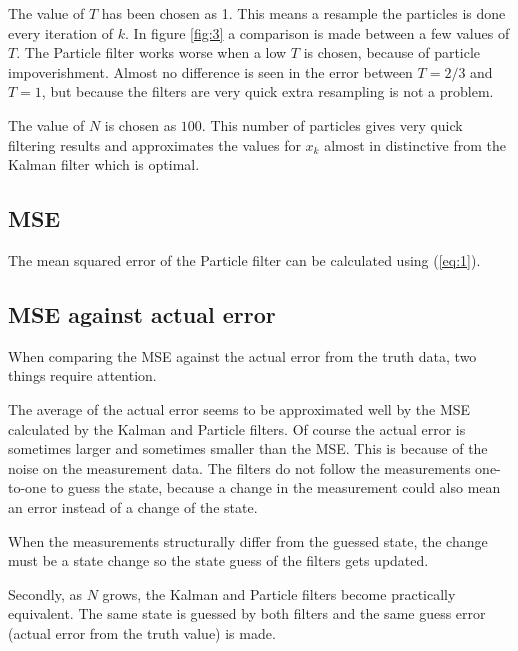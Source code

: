 \documentclass[paper=a4, fontsize=11pt]{scrartcl} %
\numberwithin{equation}{section} %
\numberwithin{figure}{section} %
\numberwithin{table}{section} %
\begin{document}
The value of $T$ has been chosen as 1. This means a resample the particles is done every iteration of $k$. In figure \ref{fig:3} a comparison is made between a few values of $T$. The Particle filter works worse when a low $T$ is chosen, because of particle impoverishment. Almost no difference is seen in the error between $T=2/3$ and $T=1$, but because the filters are very quick extra resampling is not a problem. 

The value of $N$ is chosen as $100$. This number of particles gives very quick filtering results and approximates the values for $x_k$ almost in distinctive from the Kalman filter which is optimal.

\subsection{MSE}

The mean squared error of the Particle filter can be calculated using (\ref{eq:1}).

\subsection{MSE against actual error}

When comparing the MSE against the actual error from the truth data, two things require attention.

The average of the actual error seems to be approximated well by the MSE calculated by the Kalman and Particle filters. Of course the actual error is sometimes larger and sometimes smaller than the MSE. This is because of the noise on the measurement data. The filters do not follow the measurements one-to-one to guess the state, because a change in the measurement could also mean an error instead of a change of the state. 

When the measurements structurally differ from the guessed state, the change must be a state change so the state guess of the filters gets updated.

Secondly, as $N$ grows, the Kalman and Particle filters become practically equivalent. The same state is guessed by both filters and the same guess error (actual error from the truth value) is made.
\end{document}
